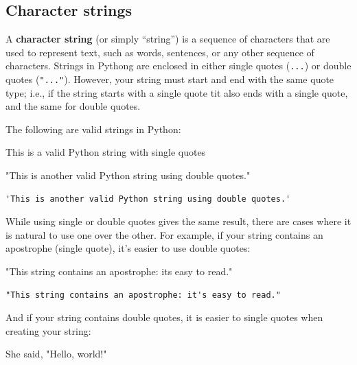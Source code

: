 \documentclass[
  letterpaper,
  DIV=11,
  numbers=noendperiod]{scrreprt}
\newenvironment{Shaded}{\begin{snugshade}}{\end{snugshade}}
\newcommand{\CommentTok}[1]{\textcolor[rgb]{0.37,0.37,0.37}{#1}}
\begin{document}
\subsection{Character strings}\label{character-strings}

A \textbf{character string} (or simply ``string'') is a sequence of
characters that are used to represent text, such as words, sentences, or
any other sequence of characters. Strings in Pythong are enclosed in
either single quotes (\texttt{\textquotesingle{}...\textquotesingle{}})
or double quotes (\texttt{"..."}). However, your string must start and
end with the same quote type; i.e., if the string starts with a single
quote tit also ends with a single quote, and the same for double quotes.

The following are valid strings in Python:

\begin{Shaded}
\begin{Highlighting}[]
\CommentTok{\textquotesingle{}This is a valid Python string with single quotes\textquotesingle{}}

\CommentTok{"This is another valid Python string using double quotes."}
\end{Highlighting}
\end{Shaded}

\begin{verbatim}
'This is another valid Python string using double quotes.'
\end{verbatim}

While using single or double quotes gives the same result, there are
cases where it is natural to use one over the other. For example, if
your string contains an apostrophe (single quote), it's easier to use
double quotes:

\begin{Shaded}
\begin{Highlighting}[]
\CommentTok{"This string contains an apostrophe: it\textquotesingle{}s easy to read."}
\end{Highlighting}
\end{Shaded}

\begin{verbatim}
"This string contains an apostrophe: it's easy to read."
\end{verbatim}

And if your string contains double quotes, it is easier to single quotes
when creating your string:

\begin{Shaded}
\begin{Highlighting}[]
\CommentTok{\textquotesingle{}She said, "Hello, world!"\textquotesingle{}}
\end{Highlighting}
\end{Shaded}
\end{document}
